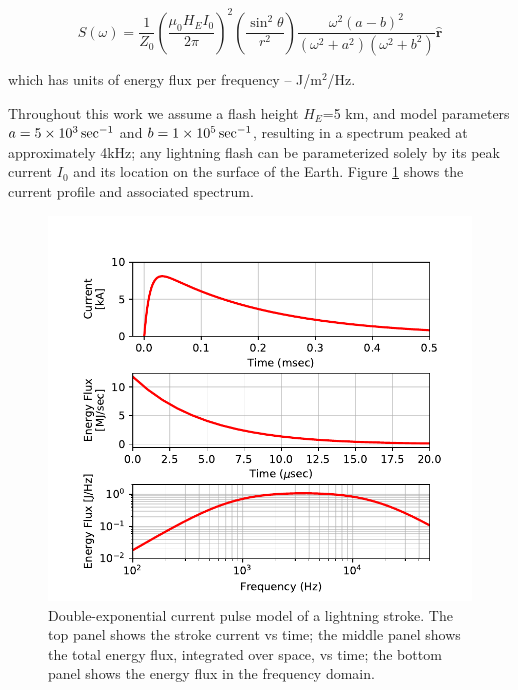 \begin{equation}
\label{eqn:farfield_power_fd}
S(\omega) = \frac{1}{Z_0}\left(\frac{\mu_0 H_E I_0}{2 \pi}\right)^2\left(\frac{\sin^2\theta}{r^2}\right) \frac{\omega^2(a-b)^2}{(\omega^2 + a^2)(\omega^2 + b^2)}  \mathbf{\hat{r}}
\end{equation}

which has units of energy flux per frequency -- J/m$^2$/Hz.

Throughout this work we assume a flash height $H_E$=5 km, and model parameters $a=5\times 10^{3}\,\mathrm{sec}^{-1}$ and $b=1\times 10^{5}\,\mathrm{sec}^{-1}$, resulting in a spectrum peaked at approximately 4kHz; any lightning flash can be parameterized solely by its peak current $I_0$ and its location on the surface of the Earth. Figure \ref{fig:lightning_spectrum} shows the current profile and associated spectrum.

\begin{figure}
\begin{center}
\includegraphics{figures/Lightning_spectra.pdf}

\caption[Time and frequency profiles of the lightning illumination model]{Double-exponential current pulse model of a lightning stroke. The top panel shows the stroke current vs time; the middle panel shows the total energy flux, integrated over space, vs time; the bottom panel shows the energy flux in the frequency domain.}
\label{fig:lightning_spectrum}
\end{center}
\end{figure}

